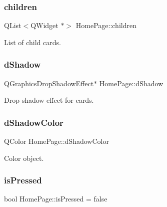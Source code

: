 \subsubsection{\texorpdfstring{children}{children}}
{\footnotesize\ttfamily Q\+List$<$Q\+Widget $\ast$$>$ Home\+Page\+::children\hspace{0.3cm}{\ttfamily [private]}}



List of child cards. 

\mbox{\label{classHomePage_a3c355759e9927e080473bd83a56eae07}} 
\subsubsection{\texorpdfstring{dShadow}{dShadow}}
{\footnotesize\ttfamily Q\+Graphics\+Drop\+Shadow\+Effect$\ast$ Home\+Page\+::d\+Shadow\hspace{0.3cm}{\ttfamily [private]}}



Drop shadow effect for cards. 

\mbox{\label{classHomePage_aa32d795233f9dcc2783c1c68e3de19c9}} 
\subsubsection{\texorpdfstring{dShadowColor}{dShadowColor}}
{\footnotesize\ttfamily Q\+Color Home\+Page\+::d\+Shadow\+Color\hspace{0.3cm}{\ttfamily [private]}}



Color object. 

\mbox{\label{classHomePage_a30d025d463d4fac7cd65e375632c48d8}} 
\subsubsection{\texorpdfstring{isPressed}{isPressed}}
{\footnotesize\ttfamily bool Home\+Page\+::is\+Pressed = false\hspace{0.3cm}{\ttfamily [private]}}



